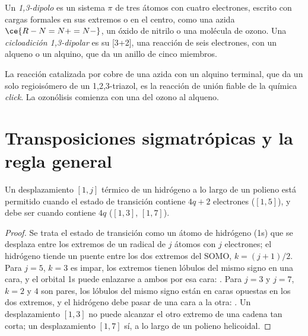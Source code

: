 \begin{definition}\label{def:b3:pericyclic:dipolar}
Un \emph{1,3-dipolo} es un sistema $\pi$ de tres átomos con cuatro
electrones, escrito con cargas formales en sus extremos o en el centro, como una
azida $\ce{R-N=N+=N-}$, un óxido de nitrilo o una molécula de ozono. Una \emph{cicloadición
1,3-dipolar} es su  [3+2], una
reacción de seis electrones, con un alqueno o un alquino, que da un anillo de cinco miembros.
\end{definition}

La reacción catalizada por cobre de una azida con un alquino terminal, que da un solo
regioisómero de un 1,2,3-triazol, es la reacción de unión fiable de la química
\textit{click}. La ozonólisis comienza con una  del ozono al
alqueno.

\section{Transposiciones sigmatrópicas y la regla general}

\begin{proposition}\label{prop:b3:pericyclic:sigmatropic-h}
Un desplazamiento $[1, j]$ térmico de un hidrógeno a lo largo de un polieno está permitido  cuando el
estado de transición contiene $4q + 2$ electrones ($[1,5]$), y debe ser  cuando contiene $4q$
($[1,3]$, $[1,7]$).
\end{proposition}

\begin{proof}
Se trata el estado de transición como un átomo de hidrógeno (1s) que se desplaza entre los extremos de un
radical de $j$ átomos con $j$ electrones; el hidrógeno tiende un puente entre los dos extremos del
SOMO, $k = (j + 1)/2$. Para $j = 5$, $k = 3$ es impar, los extremos tienen lóbulos del mismo signo en una cara,
y el orbital 1s puede enlazarse a ambos por esa cara: . Para $j = 3$ y $j = 7$,
$k = 2$ y $4$ son pares, los lóbulos del mismo signo están en caras opuestas en los dos extremos, y
el hidrógeno debe pasar de una cara a la otra: . Un desplazamiento $[1,3]$
no puede alcanzar el otro extremo de una cadena tan corta; un desplazamiento $[1,7]$ sí, a lo largo de un polieno helicoidal.
\end{proof}

